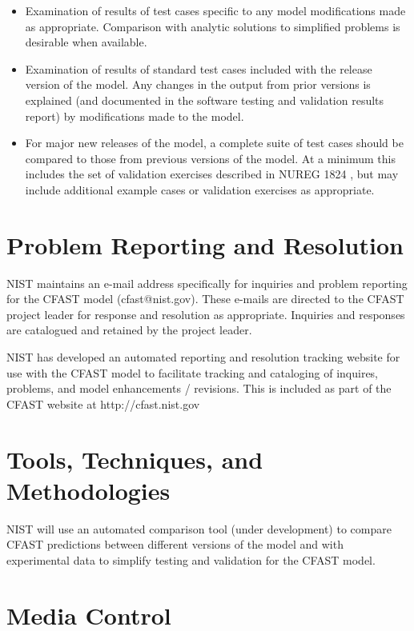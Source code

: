 \begin{itemize}
\item Examination of results of test cases specific to any model modifications made as appropriate.  Comparison with analytic solutions to simplified problems is desirable when available.

\item Examination of results of standard test cases included with the release version of the model. Any changes in the output from prior versions is explained (and documented in the software testing and validation results report) by modifications made to the model.

\item For major new releases of the model, a complete suite of test cases should be compared to those from previous versions of the model.  At a minimum this includes the set of validation exercises described in NUREG 1824 \cite{NRCNUREG1824}, but may include additional example cases or validation exercises as appropriate.
\end{itemize}

\section{Problem Reporting and Resolution}

NIST maintains an e-mail address specifically for inquiries and problem reporting for the CFAST model (cfast@nist.gov).  These e-mails are directed to the CFAST project leader for response and resolution as appropriate.  Inquiries and responses are catalogued and retained by the project leader.

NIST has developed an automated reporting and resolution tracking website for use with the CFAST model to facilitate tracking and cataloging of inquires, problems, and model enhancements / revisions. This is included as part of the CFAST website at http://cfast.nist.gov

\section{Tools, Techniques, and Methodologies}

NIST will use an automated comparison tool (under development) to compare CFAST predictions between different versions of the model and with experimental data to simplify testing and validation for the CFAST model.

\section{Media Control}

